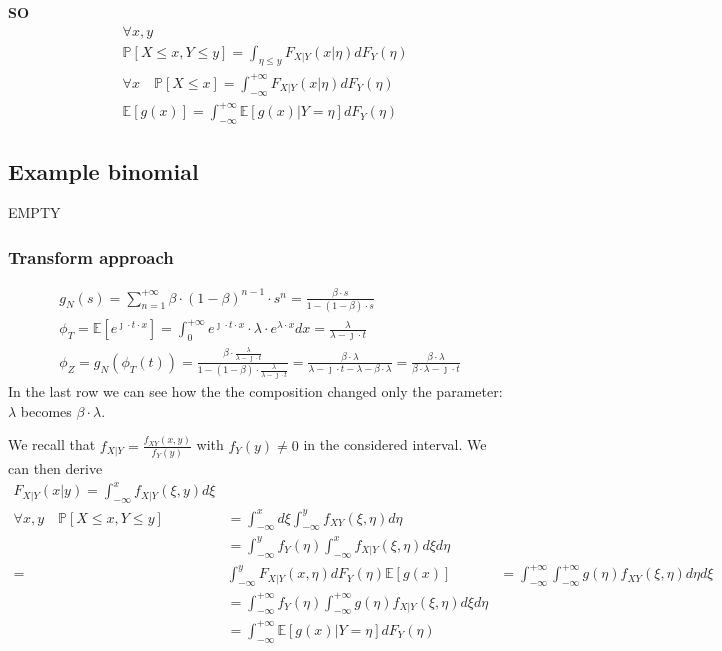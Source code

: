 \textbf{SO}
\begin{equation}
  \begin{split}
   &\forall x,y \\
  &\mathbb{P}[X\le x , Y \le y] = \int_{\eta \le y} F_{X|Y}(x|\eta) dF_Y(\eta)\\
  &\forall x \quad \mathbb{P}[X \le x] = \int_{-\infty}^{+\infty}F_{X|Y}(x|\eta) dF_Y(\eta) \\
  &\mathbb{E}[g(x)]=\int_{-\infty}^{+\infty}
  \mathbb{E}[g(x)|Y=\eta] dF_Y(\eta)
  \end{split}
\end{equation}

\subsection{Example binomial}
EMPTY

\subsubsection{Transform approach}
\begin{equation}
  \begin{split}
  g_N(s)=\sum \limits_{n=1}^{+\infty} \beta \cdot (1-\beta)^{n-1}\cdot s^n = \frac{\beta \cdot s}{1-(1-\beta)\cdot s}\\
  \phi_T=\mathbb{E}[e^{\jmath \cdot t \cdot x}] = \int_{0}^{+\infty} e^{\jmath \cdot t \cdot x} \cdot \lambda \cdot e^{ \lambda \cdot x} dx = \frac{\lambda}{\lambda - \jmath \cdot t} \\
  \phi_Z = g_N(\phi_T(t))=\frac{\beta \cdot \frac{\lambda}{\lambda - \jmath \cdot t}}{1-(1-\beta)\cdot \frac{\lambda}{\lambda - \jmath \cdot t}} =
   \frac{\beta \cdot \lambda}{\lambda - \jmath \cdot t -\lambda - \beta \cdot \lambda} = \frac{\beta \cdot \lambda}{\beta \cdot \lambda - \jmath \cdot t}
  \end{split}
\end{equation}
In the last row we can see how the the composition changed only the parameter: $\lambda$ becomes $\beta \cdot \lambda$.

We recall that $f_{X|Y} = \frac{f_{XY}(x,y)}{f_Y(y)}$ with $f_Y(y)\neq 0$ in the considered interval.
We can then derive
\begin{equation}
  \begin{split}
  F_{X|Y}(x|y) = \int_{-\infty}^{x}f_{X|Y}(\xi,y)d\xi\\
  \forall x,y \quad \mathbb{P}[X \le x , Y \le y] &= \int_{-\infty}^{x}d\xi \int_{-\infty}^{y}f_{XY}(\xi,\eta) d\eta\\
  &=\int_{-\infty}^{y}f_Y(\eta) \int_{-\infty}^{x}f_{X|Y}(\xi,\eta) d\xi d\eta \\
  =&\int_{-\infty}^{y}F_{X|Y}(x,\eta) dF_Y(\eta)
  \mathbb{E}[g(x)] &= \int_{-\infty}^{+\infty} \int_{-\infty}^{+\infty}g(\eta) f_{XY}(\xi,\eta) d\eta  d\xi \\
  &= \int_{-\infty}^{+\infty} f_Y(\eta) \int_{-\infty}^{+\infty}g(\eta) f_{X|Y}(\xi,\eta)   d\xi d\eta \\
  &= \int_{-\infty}^{+\infty}\mathbb{E}[g(x)|Y=\eta] dF_Y(\eta)
  \end{split}
\end{equation}
